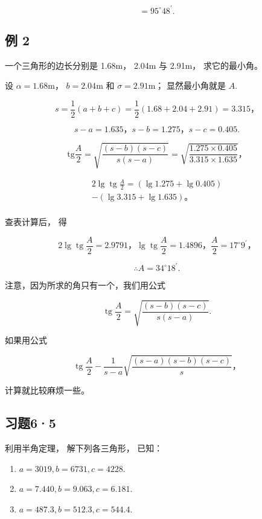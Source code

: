 \[
= 95 ^{\circ} 48 ^{\prime}.
\]

\subsection{例 2}

一个三角形的边长分别是 1.68m， 2.04m 与 2.91m， 求它的最小角。

 设 \(\alpha = 1.68\mathrm{m}\)， \(b = 2.04\mathrm{m}\)
和 \(\sigma = 2.91\mathrm{m}\)； 显然最小角就是 \(A\).

\[
s = \frac {1}{2} (a + b + c) = \frac {1}{2} (1.68 + 2.04 + 2.91) = 3.315\text{，}
\]

\[
s - a = 1.635\text{，} s - b = 1.275\text{，} s - c = 0.405.
\]

\[
\mathrm{tg} \frac {A}{2} = \sqrt {\frac {(s - b) (s - c)}{s (s - a)}} = \sqrt {\frac {1.275 \times 0.405}{3.315 \times 1.635}}\text{，}
\]

\[
\begin{array}{l} 2 \lg \operatorname{tg} \frac {A}{2} = (\lg 1.275 + \lg 0.405) \\ - (\lg 3.315 + \lg 1.635)\text{。} \\ \end{array}
\]

查表计算后， 得

\[
2 \lg \operatorname{tg} \frac {A}{2} = 2.9791\text{，} \lg \operatorname{tg} \frac {A}{2} = 1.4896\text{，} \frac {A}{2} = 17 ^{\circ} 9 ^{\prime}\text{，}
\]

\[
\therefore A = 34 ^{\circ} 18 ^{\prime}.
\]

注意，因为所求的角只有一个，我们用公式

\[
\operatorname{tg} \frac {A}{2} = \sqrt {\frac {(s - b) (s - c)}{s (s - a)}}.
\]

如果用公式

\[
\operatorname{tg} \frac {A}{2} - \frac {1}{s - a} \sqrt {\frac {(s - a) (s - b) (s - c)}{s}}\text{，}
\]

计算就比较麻烦一些。

\subsection{习题6·5}

利用半角定理， 解下列各三角形， 已知：

\begin{enumerate}
\item
  \(a = 3019, b = 6731, c = 4228.\)
\item
  \(a = 7.440, b = 9.063, c = 6.181\).
\item
  \(a = 487.3, b = 512.3, c = 544.4.\)
\end{enumerate}

